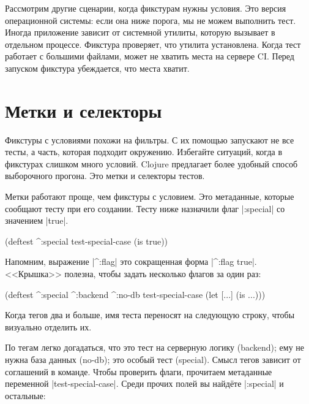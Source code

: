 Рассмотрим другие сценарии, когда фикстурам нужны условия. Это версия
операционной системы: если она ниже порога, мы не можем выполнить тест. Иногда
приложение зависит от системной утилиты, которую вызывает в отдельном
процессе. Фикстура проверяет, что утилита установлена. Когда тест работает с
большими файлами, может не хватить места на сервере CI. Перед запуском фикстура
убеждается, что места хватит.

\section{Метки и селекторы}


Фикстуры с условиями похожи на фильтры. С их помощью запускают не все тесты, а
часть, которая подходит окружению. Избегайте ситуаций, когда в фикстурах слишком
много условий. Clojure предлагает более удобный способ выборочного
прогона. Это метки и селекторы тестов.

Метки работают проще, чем фикстуры с условием. Это метаданные, которые сообщают
тесту при его создании. Тесту ниже назначили флаг \spverb|:special| со значением
\spverb|true|.

\begin{english}
  \begin{clojure}
(deftest ^:special test-special-case
  (is true))
  \end{clojure}
\end{english}


Напомним, выражение \spverb|^:flag| это сокращенная форма \spverb|^{:flag true}|.
<<Крышка>> полезна, чтобы задать несколько флагов за один раз:

\begin{english}
  \begin{clojure}
(deftest ^:special ^:backend ^:no-db
  test-special-case
  (let [...]
    (is ...)))
  \end{clojure}
\end{english}

Когда тегов два и больше, имя теста переносят на следующую строку, чтобы
визуально отделить их.

По тегам легко догадаться, что это тест на серверную логику (backend); ему не
нужна база данных (no-db); это особый тест (special). Смысл тегов зависит от
соглашений в команде. Чтобы проверить флаги, прочитаем метаданные переменной
\spverb|test-special-case|. Среди прочих полей вы найд\"{е}те \spverb|:special| и
остальные:


